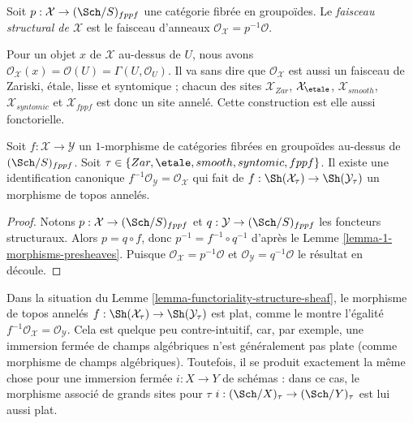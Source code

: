 \begin{definition}
\label{definition-structure-sheaf}
Soit $p : \mathcal{X} \to (\Sch/S)_{fppf}$ une catégorie
fibrée en groupoïdes. Le
{\it faisceau structural de $\mathcal{X}$} est le faisceau d'anneaux
$\mathcal{O}_\mathcal{X} = p^{-1}\mathcal{O}$.
\end{definition}

\noindent
Pour un objet $x$ de $\mathcal{X}$ au-dessus de $U$, nous avons
$\mathcal{O}_\mathcal{X}(x) = \mathcal{O}(U) = \Gamma(U, \mathcal{O}_U)$.
Il va sans dire que $\mathcal{O}_\mathcal{X}$ est aussi un faisceau de Zariski, \'etale,
lisse et syntomique ; chacun des sites
$\mathcal{X}_{Zar}$, $\mathcal{X}_\etale$, $\mathcal{X}_{smooth}$,
$\mathcal{X}_{syntomic}$ et $\mathcal{X}_{fppf}$ est donc un site annelé.
Cette construction est elle aussi fonctorielle.

\begin{lemma}
\label{lemma-functoriality-structure-sheaf}
Soit $f : \mathcal{X} \to \mathcal{Y}$ un $1$-morphisme de catégories
fibrées en groupoïdes au-dessus de $(\Sch/S)_{fppf}$. Soit
$\tau \in \{Zar, \etale, smooth, syntomic, fppf\}$.
Il existe une identification canonique
$f^{-1}\mathcal{O}_\mathcal{Y} = \mathcal{O}_\mathcal{X}$
qui fait de
$f : \Sh(\mathcal{X}_\tau) \to \Sh(\mathcal{Y}_\tau)$
un morphisme de topos annelés.
\end{lemma}

\begin{proof}
Notons $p : \mathcal{X} \to (\Sch/S)_{fppf}$ et
$q : \mathcal{Y} \to (\Sch/S)_{fppf}$ les foncteurs structuraux.
Alors $p = q \circ f$, donc $p^{-1} = f^{-1} \circ q^{-1}$ d'après le
Lemme \ref{lemma-1-morphisms-presheaves}. Puisque
$\mathcal{O}_\mathcal{X} = p^{-1}\mathcal{O}$ et
$\mathcal{O}_\mathcal{Y} = q^{-1}\mathcal{O}$
le résultat en découle.
\end{proof}

\begin{remark}
\label{remark-flat}
Dans la situation du
Lemme \ref{lemma-functoriality-structure-sheaf},
le morphisme de topos annelés
$f : \Sh(\mathcal{X}_\tau) \to \Sh(\mathcal{Y}_\tau)$
est plat, comme le montre l'égalité
$f^{-1}\mathcal{O}_\mathcal{X} = \mathcal{O}_\mathcal{Y}$.
Cela est quelque peu contre-intuitif, car, par exemple, une immersion
fermée de champs algébriques n'est généralement pas plate (comme morphisme de
champs algébriques).
Toutefois, il se produit exactement la même chose pour une immersion
fermée $i : X \to Y$ de schémas : dans ce cas, le morphisme associé
de grands sites pour $\tau$
$i : (\Sch/X)_\tau \to (\Sch/Y)_\tau$
est lui aussi plat.
\end{remark}




